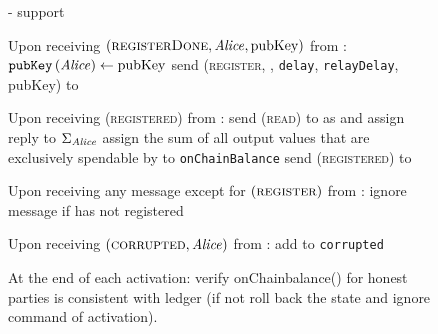 \begin{figure}[H]
\begin{systembox}{\fpaynet - support}
\begin{algorithmic}[1]
        \State Upon receiving $\left(\textsc{registerDone}, \mathit{Alice},
        \mathrm{pubKey}\right)$ from \simulator:
        \Indent
          \State $\mathtt{pubKey}\left(\mathit{Alice}\right) \gets \mathrm{pubKey}$
          \State send (\textsc{register}, \alice, \texttt{delay},
          \texttt{relayDelay}, pubKey) to \alice
        \EndIndent
        \Statex

        \State Upon receiving (\textsc{registered}) from \alice:
        \Indent
          \State send (\textsc{read}) to \ledger{} as \alice{} and assign reply
          to $\Sigma_{\mathit{Alice}}$
          \State assign the sum of all output values that are exclusively
          spendable by \alice{} to \texttt{onChainBalance}
          \State send (\textsc{registered}) to \alice
        \EndIndent
        \Statex

        \State Upon receiving any message except for
        $\left(\textsc{register}\right)$ from \alice:
        \Indent
          \State ignore message if \alice{} has not registered
        \EndIndent
        \Statex

        \State Upon receiving $\left(\textsc{corrupted}, \mathit{Alice}\right)$ from
        \simulator:
        \Indent
          \State add \alice{} to \texttt{corrupted}
        \EndIndent
        \Statex

        \State At the end of each activation: 
        \Indent
          \State verify onChainbalance() for honest parties is consistent with
          ledger (if not roll back the state and ignore command of activation).
        \EndIndent
      \end{algorithmic}
    \end{systembox}
    \caption{}
    \label{alg:fpaynet:support}
  \end{figure}


